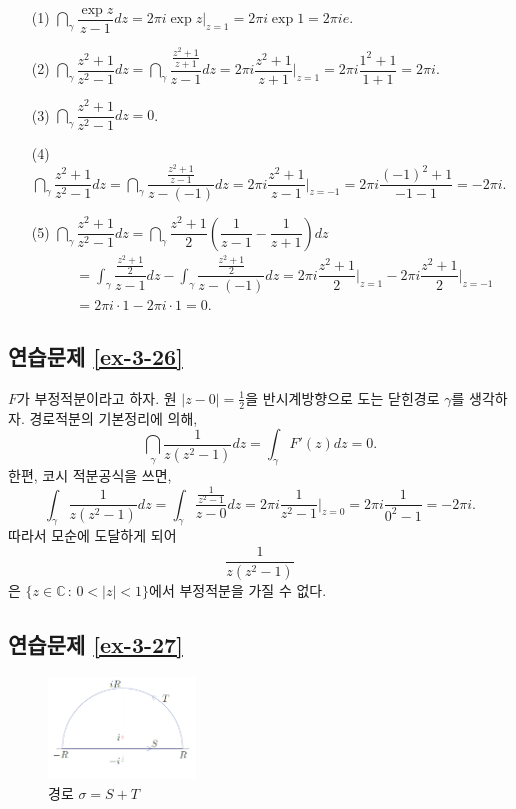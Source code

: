 \begin{itemize}
\item[(1)] $\dint_\gamma \dfrac{\exp z}{z-1}dz = 2\pi i \exp z \Big|_{z=1}
= 2\pi i \exp 1 = 2\pi i  e$.
\item[(2)] $\dint_\gamma \dfrac{z^2+1}{z^2-1}dz 
= \dint_\gamma \dfrac {\frac{z^2+1}{z+1}}{z-1}dz
= 2\pi i \dfrac{z^2+1}{z+1} \Big|_{z=1} = 2\pi i \dfrac{1^2+1}{1+1} = 2\pi i$.
\item[(3)] $\dint_\gamma \dfrac{z^2+1}{z^2-1}dz = 0$.
\item[(4)] $\dint_\gamma \dfrac{z^2+1}{z^2-1}dz 
= \dint_\gamma \dfrac{\frac{z^2+1}{z-1}}{z-(-1)}dz 
= 2\pi i \dfrac{z^2+1}{z-1} \Big|_{z=-1} = 2\pi i \dfrac{(-1)^2+1}{-1-1} = -2\pi i$.
\item[(5)] $\dint_\gamma \dfrac{z^2+1}{z^2-1}dz 
= \dint_\gamma \dfrac{z^2+1}2 \left(\dfrac1{z-1} - \dfrac1{z+1}\right)dz$
\begin{align*}
\quad &= \int_\gamma \dfrac{\frac{z^2+1}2}{z-1}dz 
- \int_\gamma \dfrac{\frac{z^2+1}2}{z-(-1)}dz 
= 2\pi i \dfrac{z^2+1}2\Big|_{z=1} - 2\pi i \dfrac{z^2+1}2 \Big|_{z=-1} \\
&= 2\pi i \cdot 1 - 2\pi i \cdot 1 = 0.
\end{align*}
\end{itemize}

\subsection*{연습문제 \ref{ex-3-26}}

$F$가 부정적분이라고 하자.
원 $|z-0| = \frac12$을 반시계방향으로 도는 닫힌경로 $\gamma$를 생각하자.
경로적분의 기본정리에 의해,
\[
\dint_\gamma \dfrac1{z(z^2-1)}dz = \int_\gamma F'(z)dz = 0.
\]
한편,  코시 적분공식을 쓰면,
\[
\int_\gamma \dfrac1{z(z^2-1)}dz = \int_\gamma  \dfrac{\frac1{z^2-1}}{z-0}dz
= 2\pi i \dfrac1{z^2-1}\Big|_{z=0} = 2\pi i \dfrac1{0^2-1} = - 2\pi i.
\]
따라서 모순에 도달하게 되어
\[
\dfrac1{z(z^2-1)}
\]
은 $\{z\in\mathbb C\,:\, 0<|z|<1\}$에서 부정적분을 가질 수 없다.

\subsection*{연습문제 \ref{ex-3-27}}

\begin{figure}[h!]
\begin{center}
\includegraphics[width=0.35\textwidth]{./Solution/figs/fig-5-20}
\end{center}
\caption{경로 $\sigma=S+T$}
\label{fig-5-20}
\end{figure}

